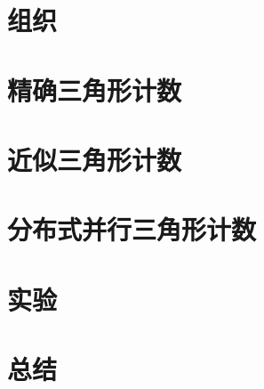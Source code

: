 \section{组织}

\section{精确三角形计数}

\section{近似三角形计数}

\section{分布式并行三角形计数}

\section{实验}

\section{总结}